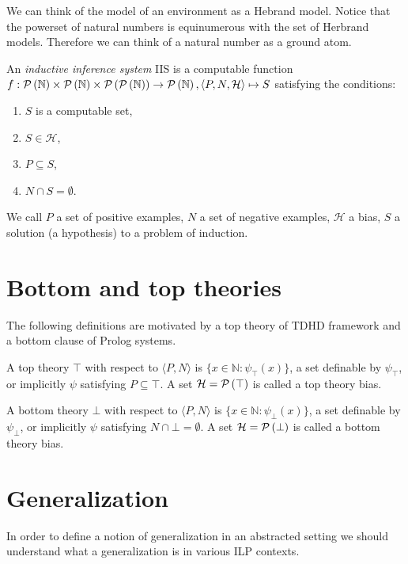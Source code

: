We can think of the model of an environment as a Hebrand model. Notice that the powerset of natural numbers is equinumerous with the set of Herbrand models. Therefore we can think of a natural number as a ground atom.

\begin{defn}
An \emph{inductive inference system} IIS is a computable function
$f: \mathcal{P} \left({ \mathbb{N} }\right) \times \mathcal{P} \left({ \mathbb{N} }\right) \times \mathcal{P} \left({ \mathcal{P} \left({ \mathbb{N} }\right) }\right)
\to \mathcal{P} \left({ \mathbb{N} }\right),
\langle P, N, \mathcal{H} \rangle \mapsto S$
satisfying the conditions:

\begin{enumerate}
\item $S$ is a computable set,
\item $S \in \mathcal{H}$,
\item $P \subseteq S$,
\item $N \cap S = \emptyset$.
\end{enumerate}
\end{defn}

We call $P$ a set of positive examples, $N$ a set of negative examples, $\mathcal{H}$ a bias, $S$ a solution (a hypothesis) to a problem of induction.

\section{Bottom and top theories}
The following definitions are motivated by a top theory of TDHD framework and a bottom clause of Prolog systems.
\begin{defn}
A top theory $\top$ with respect to $\langle P, N \rangle$ is
$\{x \in \mathbb{N} : \psi_\top(x)\}$,
a set definable by $\psi_\top$, or implicitly $\psi$ satisfying
$P \subseteq \top$.
A set $\mathcal{H}=\mathcal{P} \left({ \top }\right)$ is called a top theory bias.
\end{defn}

\begin{defn}
A bottom theory $\bot$ with respect to $\langle P, N \rangle$ is
$\{x \in \mathbb{N} : \psi_\bot(x)\}$,
a set definable by $\psi_\bot$, or implicitly $\psi$ satisfying
$N \cap \bot = \emptyset$.
A set $\mathcal{H}=\mathcal{P} \left({ \bot }\right)$ is called a bottom theory bias.
\end{defn}

\section{Generalization}
In order to define a notion of generalization in an abstracted setting we should understand what a generalization is in various ILP contexts.

